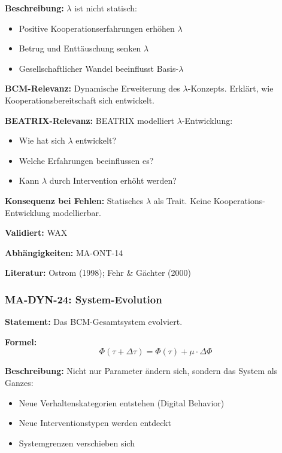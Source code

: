 \textbf{Beschreibung:}
$\lambda$ ist nicht statisch:
\begin{itemize}
    \item Positive Kooperationserfahrungen erhöhen $\lambda$
    \item Betrug und Enttäuschung senken $\lambda$
    \item Gesellschaftlicher Wandel beeinflusst Basis-$\lambda$
\end{itemize}

\textbf{BCM-Relevanz:}
Dynamische Erweiterung des $\lambda$-Konzepts. Erklärt, wie Kooperationsbereitschaft sich entwickelt.

\textbf{BEATRIX-Relevanz:}
BEATRIX modelliert $\lambda$-Entwicklung:
\begin{itemize}
    \item Wie hat sich $\lambda$ entwickelt?
    \item Welche Erfahrungen beeinflussen es?
    \item Kann $\lambda$ durch Intervention erhöht werden?
\end{itemize}

\textbf{Konsequenz bei Fehlen:}
Statisches $\lambda$ als Trait. Keine Kooperations-Entwicklung modellierbar.

\textbf{Validiert:} WAX

\textbf{Abhängigkeiten:} MA-ONT-14

\textbf{Literatur:} Ostrom (1998); Fehr \& Gächter (2000)


\subsubsection*{MA-DYN-24: System-Evolution}

\textbf{Statement:} Das BCM-Gesamtsystem evolviert.

\textbf{Formel:}
\begin{equation}
\Phi(\tau + \Delta\tau) = \Phi(\tau) + \mu \cdot \Delta\Phi
\end{equation}

\textbf{Beschreibung:}
Nicht nur Parameter ändern sich, sondern das System als Ganzes:
\begin{itemize}
    \item Neue Verhaltenskategorien entstehen (Digital Behavior)
    \item Neue Interventionstypen werden entdeckt
    \item Systemgrenzen verschieben sich
\end{itemize}

